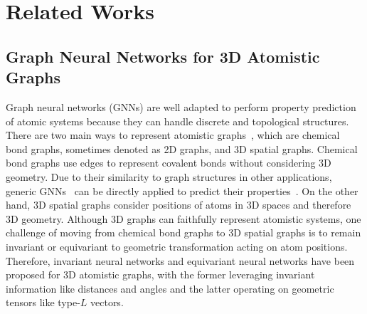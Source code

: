 \section{Related Works}
\label{appendix:sec:related_works}

\subsection{Graph Neural Networks for 3D Atomistic Graphs}
\label{appendix:subsec:gnn_3d_graphs}
Graph neural networks (GNNs) are well adapted to perform property prediction of atomic systems because they can handle discrete and topological structures.
There are two main ways to represent atomistic graphs~\citep{atom3d}, which are chemical bond graphs, sometimes denoted as 2D graphs, and 3D spatial graphs.
Chemical bond graphs use edges to represent covalent bonds without considering 3D geometry.
Due to their similarity to graph structures in other applications, generic GNNs~\citep{graphsage, neural_message_passing_quantum_chemistry, gcn, gin, gat, gatv2} can be directly applied to predict their properties~\citep{qm9_2, qm9_1, deepchem, ogb, ogblsc}.
On the other hand, 3D spatial graphs consider positions of atoms in 3D spaces and therefore 3D geometry.
Although 3D graphs can faithfully represent atomistic systems, one challenge of moving from chemical bond graphs to 3D spatial graphs is to remain invariant or equivariant to geometric transformation acting on atom positions.
Therefore, invariant neural networks and equivariant neural networks have been proposed for 3D atomistic graphs, with the former leveraging invariant information like distances and angles and the latter operating on geometric tensors like type-$L$ vectors.



